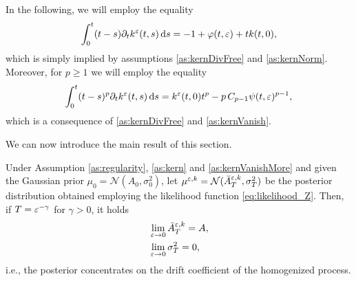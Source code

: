 \documentclass[10pt]{article}
\begin{document}
\begin{example}
	
\end{example}

\begin{remark}\label{rem:kernDeriv} In the following, we will employ the equality
	\begin{equation}\label{eq:kernDiffEquality}
		\int_0^t (t-s) \partial_t k^\varepsilon(t, s) \,\mathrm{d} s = - 1 + \varphi(t, \varepsilon) + t k(t, 0),
	\end{equation}
	which is simply implied by assumptions \ref{as:kernDivFree} and \ref{as:kernNorm}. Moreover, for $p \geq 1$ we will employ the equality
	\begin{equation}
		\int_0^t (t-s)^p \partial_t k^\varepsilon(t, s) \,\mathrm{d} s = k^{\varepsilon}(t, 0)t^p - p \,C_{p-1} \psi(t, \varepsilon)^{p-1},
	\end{equation}
	which is a consequence of \ref{as:kernDivFree} and \ref{as:kernVanish}.
\end{remark}

We can now introduce the main result of this section.

\begin{theorem}\label{thm:mainResultN1} Under Assumption \ref{as:regularity}, \ref{as:kern} and \ref{as:kernVanishMore} and given the Gaussian prior $\mu_0 = \mathcal N(A_0, \sigma_0^2)$, let $\mu^{\varepsilon,k} = \mathcal N(\bar A^{\varepsilon,k}_T, \sigma^2_T)$ be the posterior distribution obtained employing the likelihood function \eqref{eq:likelihood_Z}. Then, if $T = \varepsilon^{-\gamma}$ for $\gamma > 0$, it holds
	\begin{equation}
	\begin{aligned}
		&\lim_{\varepsilon \to 0} \bar A^{\varepsilon,k}_T = A, \\
		&\lim_{\varepsilon \to 0} \sigma^2_T = 0,
	\end{aligned}
	\end{equation}
	i.e., the posterior concentrates on the drift coefficient of the homogenized process. 
\end{theorem}
\end{document}

